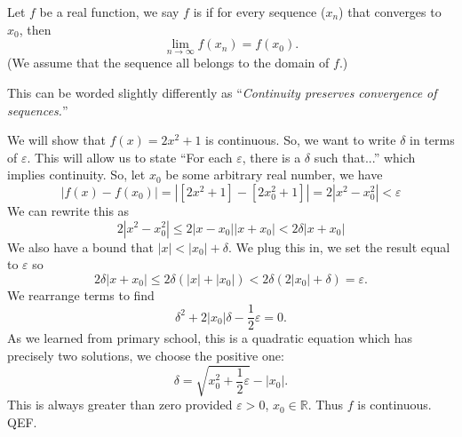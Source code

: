 \begin{defn}
Let $f$ be a real function, we say $f$ is  if for every sequence ($x_{n}$) that converges to
$x_{0}$, then
\begin{equation}
\lim_{n\to\infty}f(x_n)=f(x_{0}).
\end{equation}
(We assume that the sequence all belongs to the domain of $f$.)
\end{defn}
\begin{rmk}
This can be worded slightly differently as ``\emph{Continuity
  preserves convergence of sequences.}''
\end{rmk}
\begin{ex} We will show that $f(x)=2x^{2}+1$ is continuous. So, we
  want to write $\delta$ in terms of $\varepsilon$. This will allow
  us to state ``For each $\varepsilon$, there is a $\delta$ such
  that...'' which implies continuity. So, let $x_0$ be some
  arbitrary real number, we have
\begin{equation}
|f(x)-f(x_{0})| = |\left[2x^2+1\right]-\left[2x_{0}^{2}+1\right]|
= 2|x^2-x_{0}^{2}|<\varepsilon
\end{equation}
We can rewrite this as
\begin{equation}
2|x^{2}-x_{0}^{2}|\leq 2|x-x_{0}||x+x_{0}|<2\delta|x+x_{0}|
\end{equation}
We also have a bound that $|x|<|x_{0}|+\delta$. We plug this in,
we set the result equal to $\varepsilon$ so
\begin{equation}
2\delta|x+x_{0}|\leq2\delta(|x|+|x_0|)<2\delta(2|x_{0}|+\delta)=\varepsilon.
\end{equation}
We rearrange terms to find
\begin{equation}
\delta^{2}+2|x_{0}|\delta - \frac{1}{2}\varepsilon = 0.
\end{equation}
As we learned from primary school, this is a quadratic equation
which has precisely two solutions, we choose the positive one:
\begin{equation}
\delta = \sqrt{x_{0}^{2}+\frac{1}{2}\varepsilon}-|x_{0}|.
\end{equation}
This is always greater than zero provided $\varepsilon>0$,
$x_{0}\in\mathbb{R}$. Thus $f$ is continuous. QEF.
\end{ex}
